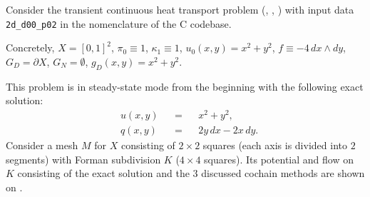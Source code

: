 \begin{example}
  Consider the transient continuous heat transport problem
  (,
   ,
   )
  with input data \verb|2d_d00_p02| in the nomenclature of the C codebase.

  Concretely,
    $X = [0, 1]^2$,
    $\pi_0 \equiv 1$,
    $\kappa_1 \equiv 1$,
    $u_0(x, y) = x^2 + y^2$,
    $f \equiv - 4\, d x \wedge d y$,
    $G_D = \partial X$,
    $G_N = \emptyset$,
    $g_D(x, y) = x^2 + y^2$.

  This problem is in steady-state mode from the beginning
  with the following exact solution:
  \begin{subequations}
    \begin{alignat}{3}
      & u(x, y) && = && x^2 + y^2, \\
      & q(x, y) && = && 2 y\, d x - 2 x\, d y.
    \end{alignat}
  \end{subequations}
  Consider a mesh $M$ for $X$ consisting of $2 \times 2$ squares (each axis is
  divided into $2$ segments) with Forman subdivision $K$ ($4 \times 4$ squares).
  Its potential and flow on $K$ consisting of the exact solution and the $3$
  discussed cochain methods are shown on
  .
\end{example}

